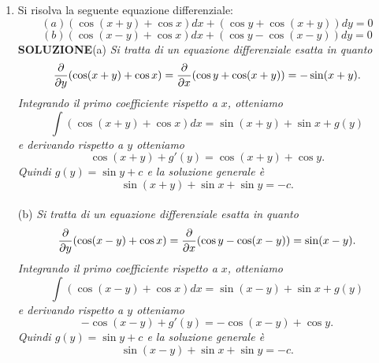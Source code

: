 \documentclass[12pt,a4paper]{report}\pagenumbering{roman}
\begin{document}
\begin{enumerate}
\item Si risolva la seguente equazione differenziale:
$$(a) (\cos(x+y)+\cos x)dx+(\cos y+\cos(x+y))dy=0$$
$$(b) (\cos(x-y)+\cos x)dx+(\cos y-\cos(x-y))dy=0$$
{\bf SOLUZIONE}(a) {\it Si tratta di un equazione differenziale esatta in quanto
$${\partial\over\partial y}(\cos(x+y)+\cos x)={\partial\over\partial x}(\cos y+\cos(x+y))
=-\sin(x+y).$$
Integrando il primo coefficiente rispetto a $x$, otteniamo
$$\int(\cos(x+y)+\cos x)dx=\sin(x+y)+\sin x+g(y)$$
e derivando rispetto a $y$ otteniamo
$$\cos(x+y)+g'(y)=\cos(x+y)+\cos y.$$
Quindi $g(y)=\sin y +c$ e la soluzione generale \`e
$$\sin(x+y)+\sin x+\sin y=-c.$$}\\
(b) {\it Si tratta di un equazione differenziale esatta in quanto
$${\partial\over\partial y}(\cos(x-y)+\cos x)={\partial\over\partial x}(\cos y-\cos(x-y))
=\sin(x-y).$$
Integrando il primo coefficiente rispetto a $x$, otteniamo
$$\int(\cos(x-y)+\cos x)dx=\sin(x-y)+\sin x+g(y)$$
e derivando rispetto a $y$ otteniamo
$$-\cos(x-y)+g'(y)=-\cos(x-y)+\cos y.$$
Quindi $g(y)=\sin y +c$ e la soluzione generale \`e
$$\sin(x-y)+\sin x+\sin y=-c.$$}
\end{enumerate}
\end{document}
